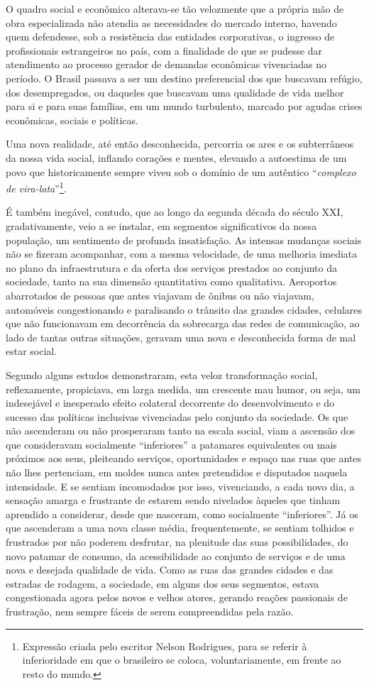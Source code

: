 O quadro social e econômico alterava-se tão velozmente que a própria mão
de obra especializada não atendia as necessidades do mercado interno,
havendo quem defendesse, sob a resistência das entidades corporativas, o
ingresso de profissionais estrangeiros no país, com a finalidade de que
se pudesse dar atendimento ao processo gerador de demandas econômicas
vivenciadas no período. O Brasil passava a ser um destino preferencial
dos que buscavam refúgio, dos desempregados, ou daqueles que buscavam
uma qualidade de vida melhor para si e para suas famílias, em um mundo
turbulento, marcado por agudas crises econômicas, sociais e políticas.

Uma nova realidade, até então desconhecida, percorria os ares e os
subterrâneos da nossa vida social, inflando corações e mentes, elevando
a autoestima de um povo que historicamente sempre viveu sob o domínio de
um autêntico ``\emph{complexo de vira-lata}''\footnote{Expressão criada
  pelo escritor Nelson Rodrigues, para se referir à inferioridade em que
  o brasileiro se coloca, voluntariamente, em frente ao resto do mundo.}.

É também inegável, contudo, que ao longo da segunda década do século
XXI, gradativamente, veio a se instalar, em segmentos significativos da
nossa população, um sentimento de profunda insatisfação. As intensas
mudanças sociais não se fizeram acompanhar, com a mesma velocidade, de
uma melhoria imediata no plano da infraestrutura e da oferta dos
serviços prestados ao conjunto da sociedade, tanto na sua dimensão
quantitativa como qualitativa. Aeroportos abarrotados de pessoas que
antes viajavam de ônibus ou não viajavam, automóveis congestionando e
paralisando o trânsito das grandes cidades, celulares que não
funcionavam em decorrência da sobrecarga das redes de comunicação, ao
lado de tantas outras situações, geravam uma nova e desconhecida forma
de mal estar social.

Segundo alguns estudos demonstraram, esta veloz transformação social,
reflexamente, propiciava, em larga medida, um crescente mau humor, ou
seja, um indesejável e inesperado efeito colateral decorrente do
desenvolvimento e do sucesso das políticas inclusivas vivenciadas pelo
conjunto da sociedade. Os que não ascenderam ou não prosperaram tanto na
escala social, viam a ascensão dos que consideravam socialmente
``inferiores'' a patamares equivalentes ou mais próximos aos seus,
pleiteando serviços, oportunidades e espaço nas ruas que antes não lhes
pertenciam, em moldes nunca antes pretendidos e disputados naquela
intensidade. E se sentiam incomodados por isso, vivenciando, a cada novo
dia, a sensação amarga e frustrante de estarem sendo nivelados àqueles
que tinham aprendido a considerar, desde que nasceram, como socialmente
``inferiores''. Já os que ascenderam a uma nova classe média,
frequentemente, se sentiam tolhidos e frustrados por não poderem
desfrutar, na plenitude das suas possibilidades, do novo patamar de
consumo, da acessibilidade ao conjunto de serviços e de uma nova e
desejada qualidade de vida. Como as ruas das grandes cidades e das
estradas de rodagem, a sociedade, em alguns dos seus segmentos, estava
congestionada agora pelos novos e velhos atores, gerando reações
passionais de frustração, nem sempre fáceis de serem compreendidas pela
razão.

